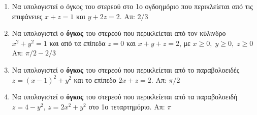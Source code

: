 \begin{enumerate}
  \item Να υπολογιστεί ο όγκος του στερεού στο 1ο ογδοημόριο που περικλείεται από τις 
    επιφάνειες $ x+z=1 $ και $ y+2z=2 $. \hfill Απ: 2/3 

  \item Να υπολογιστεί ο \textbf{όγκος} του στερεού που περικλείεται από τον κύλινδρο 
    $ x^{2}+y^{2}=1 $ και από τα επίπεδα $ z=0 $ και $ x+y+z=2 $, με 
    $ x \geq 0, \; y \geq 0, \; z \geq 0$ \hfill Απ: $ {\pi}/{2} - {2}/{3} $ 

  \item Να υπολογιστεί ο \textbf{όγκος} του στερεού που περικλείεται από το 
    παραβολοειδές  $ z = (x-1)^{2}+y^{2} $ και το επίπεδο $ 2x+z=2 $.
    \hfill Απ: $ {\pi}/{2} $

  \item Να υπολογιστεί ο \textbf{όγκος} του στερεού που περικλείεται από τα παραβολοειδή 
    $ z = 4 -y^{2} $, $ z = 2x^{2}+y^{2} $ στο 1ο τεταρτημόριο. 
    \hfill Απ: $ \pi $ 


\end{enumerate}


